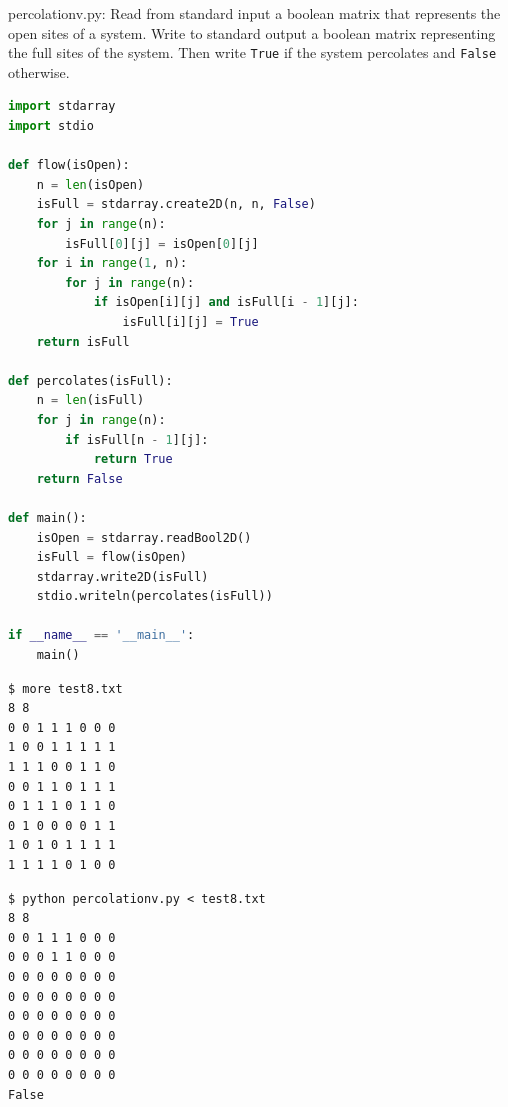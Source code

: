 \documentclass[8pt,a4paper,compress]{beamer}
\begin{document}
\begin{frame}[fragile]
\pause

\begin{framed}
\tiny percolationv.py: Read from standard input a boolean matrix that represents the open sites of a system. Write to standard output a boolean matrix representing the full sites of the system. Then write \lstinline{True} if the system percolates and \lstinline{False} otherwise.
\end{framed}

\begin{lstlisting}[language=Python]
import stdarray
import stdio

def flow(isOpen):
    n = len(isOpen)
    isFull = stdarray.create2D(n, n, False)
    for j in range(n):
        isFull[0][j] = isOpen[0][j]
    for i in range(1, n):
        for j in range(n):
            if isOpen[i][j] and isFull[i - 1][j]:
                isFull[i][j] = True
    return isFull

def percolates(isFull):
    n = len(isFull)
    for j in range(n):
        if isFull[n - 1][j]:
            return True
    return False

def main():
    isOpen = stdarray.readBool2D()
    isFull = flow(isOpen)
    stdarray.write2D(isFull)
    stdio.writeln(percolates(isFull))
    
if __name__ == '__main__':
    main()
\end{lstlisting}
\end{frame}

\begin{frame}[fragile]
\pause

\begin{lstlisting}[language={}]
$ more test8.txt 
8 8
0 0 1 1 1 0 0 0
1 0 0 1 1 1 1 1
1 1 1 0 0 1 1 0
0 0 1 1 0 1 1 1
0 1 1 1 0 1 1 0
0 1 0 0 0 0 1 1
1 0 1 0 1 1 1 1
1 1 1 1 0 1 0 0
\end{lstlisting}

\pause

\begin{lstlisting}[language={}]
$ python percolationv.py < test8.txt 
8 8
0 0 1 1 1 0 0 0 
0 0 0 1 1 0 0 0 
0 0 0 0 0 0 0 0 
0 0 0 0 0 0 0 0 
0 0 0 0 0 0 0 0 
0 0 0 0 0 0 0 0 
0 0 0 0 0 0 0 0 
0 0 0 0 0 0 0 0 
False
\end{lstlisting}
\end{frame}
\end{document}
